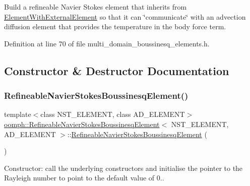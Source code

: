 Build a refineable Navier Stokes element that inherits from \hyperlink{classoomph_1_1ElementWithExternalElement}{Element\+With\+External\+Element} so that it can \char`\"{}communicate\char`\"{} with an advection diffusion element that provides the temperature in the body force term. 

Definition at line 70 of file multi\+\_\+domain\+\_\+boussinesq\+\_\+elements.\+h.



\subsection{Constructor \& Destructor Documentation}
\mbox{\label{classoomph_1_1RefineableNavierStokesBoussinesqElement_af9fd72e50fb7d6aaf43bd982ce3de295}} 
\subsubsection{\texorpdfstring{Refineable\+Navier\+Stokes\+Boussinesq\+Element()}{RefineableNavierStokesBoussinesqElement()}}
{\footnotesize\ttfamily template$<$class N\+S\+T\+\_\+\+E\+L\+E\+M\+E\+NT, class A\+D\+\_\+\+E\+L\+E\+M\+E\+NT$>$ \\
\hyperlink{classoomph_1_1RefineableNavierStokesBoussinesqElement}{oomph\+::\+Refineable\+Navier\+Stokes\+Boussinesq\+Element}$<$ N\+S\+T\+\_\+\+E\+L\+E\+M\+E\+NT, A\+D\+\_\+\+E\+L\+E\+M\+E\+NT $>$\+::\hyperlink{classoomph_1_1RefineableNavierStokesBoussinesqElement}{Refineable\+Navier\+Stokes\+Boussinesq\+Element} (\begin{DoxyParamCaption}{ }\end{DoxyParamCaption})\hspace{0.3cm}{\ttfamily [inline]}}



Constructor\+: call the underlying constructors and initialise the pointer to the Rayleigh number to point to the default value of 0.. 



